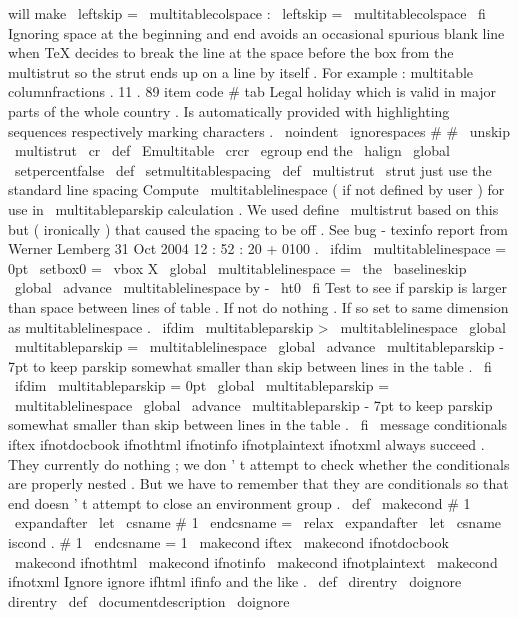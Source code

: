{{{{{will
make
\
leftskip
=
\
multitablecolspace
:
\
leftskip
=
\
multitablecolspace
\
fi
%
Ignoring
space
at
the
beginning
and
end
avoids
an
occasional
spurious
%
blank
line
when
TeX
decides
to
break
the
line
at
the
space
before
the
%
box
from
the
multistrut
so
the
strut
ends
up
on
a
line
by
itself
.
%
For
example
:
%
multitable
columnfractions
.
11
.
89
%
item
code
{
#
}
%
tab
Legal
holiday
which
is
valid
in
major
parts
of
the
whole
country
.
%
Is
automatically
provided
with
highlighting
sequences
respectively
%
marking
characters
.
\
noindent
\
ignorespaces
#
#
\
unskip
\
multistrut
}
\
cr
}
\
def
\
Emultitable
{
%
\
crcr
\
egroup
%
end
the
\
halign
\
global
\
setpercentfalse
}
\
def
\
setmultitablespacing
{
%
\
def
\
multistrut
{
\
strut
}
%
just
use
the
standard
line
spacing
%
%
Compute
\
multitablelinespace
(
if
not
defined
by
user
)
for
use
in
%
\
multitableparskip
calculation
.
We
used
define
\
multistrut
based
on
%
this
but
(
ironically
)
that
caused
the
spacing
to
be
off
.
%
See
bug
-
texinfo
report
from
Werner
Lemberg
31
Oct
2004
12
:
52
:
20
+
0100
.
\
ifdim
\
multitablelinespace
=
0pt
\
setbox0
=
\
vbox
{
X
}
\
global
\
multitablelinespace
=
\
the
\
baselineskip
\
global
\
advance
\
multitablelinespace
by
-
\
ht0
\
fi
%
Test
to
see
if
parskip
is
larger
than
space
between
lines
of
%
table
.
If
not
do
nothing
.
%
If
so
set
to
same
dimension
as
multitablelinespace
.
\
ifdim
\
multitableparskip
>
\
multitablelinespace
\
global
\
multitableparskip
=
\
multitablelinespace
\
global
\
advance
\
multitableparskip
-
7pt
%
to
keep
parskip
somewhat
smaller
%
than
skip
between
lines
in
the
table
.
\
fi
%
\
ifdim
\
multitableparskip
=
0pt
\
global
\
multitableparskip
=
\
multitablelinespace
\
global
\
advance
\
multitableparskip
-
7pt
%
to
keep
parskip
somewhat
smaller
%
than
skip
between
lines
in
the
table
.
\
fi
}
\
message
{
conditionals
}
%
iftex
ifnotdocbook
ifnothtml
ifnotinfo
ifnotplaintext
%
ifnotxml
always
succeed
.
They
currently
do
nothing
;
we
don
'
t
%
attempt
to
check
whether
the
conditionals
are
properly
nested
.
But
we
%
have
to
remember
that
they
are
conditionals
so
that
end
doesn
'
t
%
attempt
to
close
an
environment
group
.
%
\
def
\
makecond
#
1
{
%
\
expandafter
\
let
\
csname
#
1
\
endcsname
=
\
relax
\
expandafter
\
let
\
csname
iscond
.
#
1
\
endcsname
=
1
}
\
makecond
{
iftex
}
\
makecond
{
ifnotdocbook
}
\
makecond
{
ifnothtml
}
\
makecond
{
ifnotinfo
}
\
makecond
{
ifnotplaintext
}
\
makecond
{
ifnotxml
}
%
Ignore
ignore
ifhtml
ifinfo
and
the
like
.
%
\
def
\
direntry
{
\
doignore
{
direntry
}
}
\
def
\
documentdescription
{
\
doignore
}}}}
